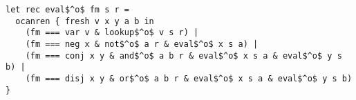 \begin{lstlisting}
let rec eval$^o$ fm s r =
  ocanren { fresh v x y a b in
    (fm === var v & lookup$^o$ v s r) |
    (fm === neg x & not$^o$ a r & eval$^o$ x s a) |
    (fm === conj x y & and$^o$ a b r & eval$^o$ x s a & eval$^o$ y s b) |
    (fm === disj x y & or$^o$ a b r & eval$^o$ x s a & eval$^o$ y s b) }
  \end{lstlisting}